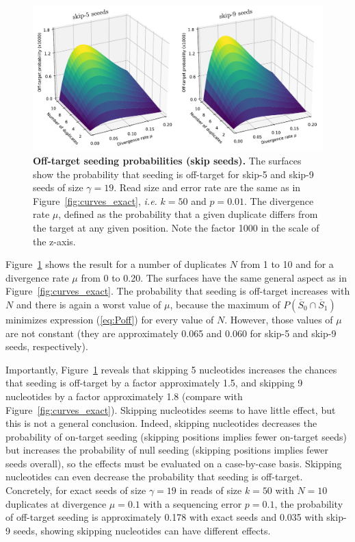 \documentclass{article}
\begin{document}
\begin{figure}[h]
\centering
\includegraphics[scale=0.47]{curves_skip.pdf}
\caption{\textbf{Off-target seeding probabilities (skip seeds).}
The surfaces show the probability that seeding is off-target for skip-5
and skip-9 seeds of size $\gamma=19$. Read size and error rate are the
same as in Figure~\ref{fig:curves_exact}, \textit{i.e.} $k=50$ and
$p=0.01$. The divergence rate $\mu$, defined as the probability that a
given duplicate differs from the target at any given position. Note the
factor 1000 in the scale of the z-axis.}
\label{fig:curves_skip}
\end{figure}

Figure~\ref{fig:curves_skip} shows the result for a number of duplicates $N$
from 1 to 10 and for a divergence rate $\mu$ from 0 to 0.20. The surfaces
have the same general aspect as in Figure~\ref{fig:curves_exact}. The
probability that seeding is off-target increases with $N$ and there is
again a  worst value of $\mu$, because the maximum of $P(\overline{S}_0
\cap \overline{S}_1)$ minimizes expression (\ref{eq:Poff}) for every value
of $N$. However, those values of $\mu$ are not constant (they are
approximately 0.065 and 0.060 for skip-5 and skip-9 seeds, respectively).

Importantly, Figure~\ref{fig:curves_skip} reveals that skipping 5
nucleotides increases the chances that seeding is off-target by a factor
approximately 1.5, and skipping 9 nucleotides by a factor approximately
1.8 (compare with Figure~\ref{fig:curves_exact}). Skipping nucleotides
seems to have little effect, but this is not a general conclusion. Indeed,
skipping nucleotides decreases the probability of on-target seeding
(skipping positions implies fewer on-target seeds) but increases the
probability of null seeding (skipping positions implies fewer seeds
overall), so the effects must be evaluated on a case-by-case basis.
Skipping nucleotides can even decrease the probability that seeding is
off-target. Concretely, for exact seeds of size $\gamma=19$ in reads of
size $k=50$ with $N=10$ duplicates at divergence $\mu=0.1$ with a
sequencing error $p=0.1$, the probability of off-target seeding is
approximately 0.178 with exact seeds and 0.035 with skip-9 seeds, showing
skipping nucleotides can have different effects.
\end{document}

